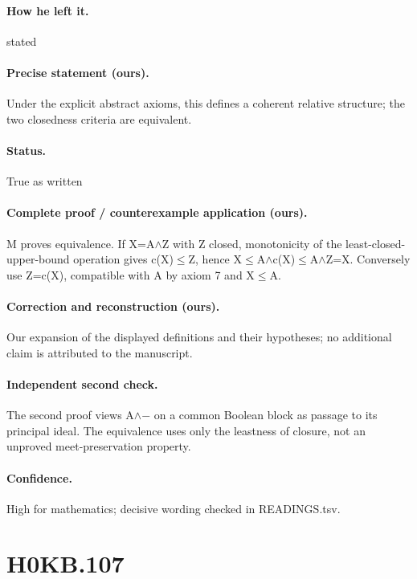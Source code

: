 \paragraph{How he left it.} stated

\paragraph{Precise statement (ours).} Under the explicit abstract axioms, this defines a coherent relative structure; the two closedness criteria are equivalent.

\paragraph{Status.} True as written

\paragraph{Complete proof / counterexample application (ours).} M proves equivalence. If X=A\ensuremath{\wedge}Z with Z closed, monotonicity of the least-closed-upper-bound operation gives c(X)\ensuremath{\leq}Z, hence X\ensuremath{\leq}A\ensuremath{\wedge}c(X)\ensuremath{\leq}A\ensuremath{\wedge}Z=X. Conversely use Z=c(X), compatible with A by axiom 7 and X\ensuremath{\leq}A.

\paragraph{Correction and reconstruction (ours).} Our expansion of the displayed definitions and their hypotheses; no additional claim is attributed to the manuscript.

\paragraph{Independent second check.} The second proof views A\ensuremath{\wedge}\ensuremath{-} on a common Boolean block as passage to its principal ideal. The equivalence uses only the leastness of closure, not an unproved meet-preservation property.

\paragraph{Confidence.} High for mathematics; decisive wording checked in READINGS.tsv.

\section*{H0KB.107}\label{statement:H0KB.107}
